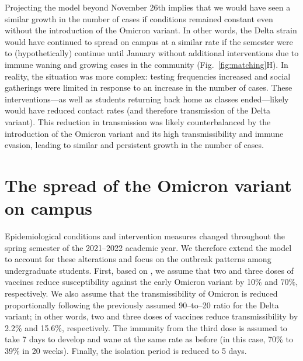 \documentclass[12pt]{article}
\newcommand{\fref}[1]{Fig.~\ref{fig:#1}}
\begin{document}
Projecting the model beyond November 26th implies that we would have seen a similar growth in the number of cases if conditions remained constant even without the introduction of the Omicron variant.
In other words, the Delta strain would have continued to spread on campus at a similar rate if the semester were to (hypothetically) continue until January without additional interventions due to immune waning and growing cases in the community (\fref{matching}H).
In reality, the situation was more complex: testing frequencies increased and social gatherings were limited in response to an increase in the number of cases.
These interventions---as well as students returning back home as classes ended---likely would have reduced contact rates (and therefore transmission of the Delta variant).
This reduction in transmission was likely counterbalanced by the introduction of the Omicron variant and its high transmissibility and immune evasion, leading to similar and persistent growth in the number of cases.

\section*{The spread of the Omicron variant on campus}

Epidemiological conditions and intervention measures changed throughout the spring semester of the 2021--2022 academic year.
We therefore extend the model to account for these alterations and focus on the outbreak patterns among undergraduate students.
First, based on \citep{ferguson2021report}, we assume that two and three doses of vaccines reduce susceptibility against the early Omicron variant by 10\% and 70\%, respectively. 
We also assume that the transmissibility of Omicron is reduced proportionally following the previously assumed 90--to--20 ratio for the Delta variant;
in other words, two and three doses of vaccines reduce transmissibility by 2.2\% and 15.6\%, respectively.
The immunity from the third dose is assumed to take 7 days to develop \citep{moreira2022safety} and wane at the same rate as before (in this case, 70\% to 39\% in 20 weeks).
Finally, the isolation period is reduced to 5 days.
\end{document}
